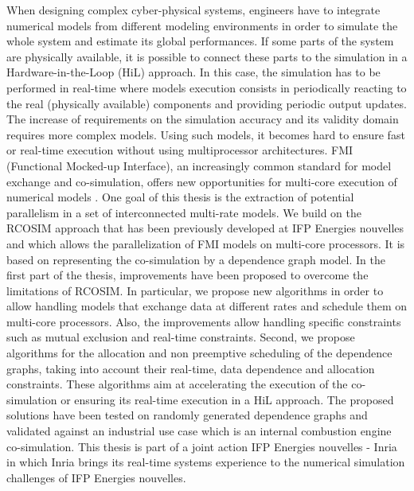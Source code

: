 When designing complex cyber-physical systems, engineers have to integrate numerical models
from different
modeling environments in order to simulate the whole system and estimate its global
performances. If some parts of the system are physically available, it is possible to connect these
parts to the simulation in a Hardware-in-the-Loop (HiL) approach. In this case, the
simulation has to be performed in real-time where models execution consists in periodically
reacting to the real (physically available) components and providing periodic output updates. The
increase of requirements on the simulation accuracy and its validity domain requires more
complex models. Using such models, it becomes hard to ensure fast or real-time execution without using
multiprocessor architectures. FMI (Functional Mocked-up Interface), an increasingly common
standard for model exchange and co-simulation, offers
new opportunities for multi-core execution
of numerical models%
. One goal of this thesis is the extraction of potential parallelism in a set of interconnected multi-rate models. We build on the RCOSIM approach that has been previously developed at IFP Energies nouvelles and which allows the parallelization of FMI models on multi-core processors. It is based on representing the co-simulation by a dependence graph model. In the first part of the thesis, improvements have been proposed to overcome the limitations of RCOSIM. In particular, we propose new algorithms in order to allow
handling models that exchange data at different
rates and schedule them on multi-core processors. Also, the improvements allow handling specific constraints such as mutual exclusion and real-time constraints. 
Second, we propose algorithms for the allocation and non preemptive scheduling of the dependence graphs, taking
into account their real-time, data dependence and allocation constraints. These algorithms aim at accelerating the execution of the co-simulation or ensuring its real-time execution in a HiL approach.
The proposed solutions have been tested on randomly generated dependence graphs and validated against an industrial use case which is an internal combustion engine co-simulation.
This thesis is part of a joint action IFP Energies nouvelles - Inria in which Inria brings its real-time systems experience to the numerical simulation challenges of IFP Energies nouvelles.